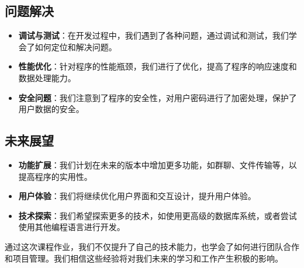 \documentclass[UTF8]{ctexart}
\begin{document}
\subsection*{问题解决}

\begin{itemize}
	\item \textbf{调试与测试}：在开发过程中，我们遇到了各种问题，通过调试和测试，我们学会了如何定位和解决问题。
	\item \textbf{性能优化}：针对程序的性能瓶颈，我们进行了优化，提高了程序的响应速度和数据处理能力。
	\item \textbf{安全问题}：我们注意到了程序的安全性，对用户密码进行了加密处理，保护了用户数据的安全。
\end{itemize}

\subsection*{未来展望}

\begin{itemize}
	\item \textbf{功能扩展}：我们计划在未来的版本中增加更多功能，如群聊、文件传输等，以提高程序的实用性。
	\item \textbf{用户体验}：我们将继续优化用户界面和交互设计，提升用户体验。
	\item \textbf{技术探索}：我们希望探索更多的技术，如使用更高级的数据库系统，或者尝试使用其他编程语言进行开发。
\end{itemize}

通过这次课程作业，我们不仅提升了自己的技术能力，也学会了如何进行团队合作和项目管理。我们相信这些经验将对我们未来的学习和工作产生积极的影响。
\appendix
\end{document}
